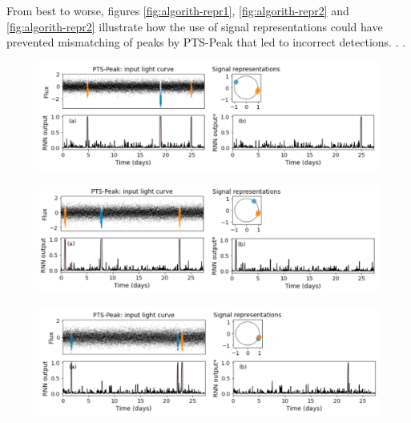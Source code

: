 From best to worse, figures \ref{fig:algorith-repr1}, \ref{fig:algorith-repr2} and \ref{fig:algorith-repr2} illustrate how the use of signal representations could have prevented mismatching of peaks by PTS-Peak that led to incorrect detections. . .

\begin{figure}
    \centering
    \includegraphics[width=0.9\linewidth]{Experiments/Figures/Algorithm/repr1.png}
    \caption{}
    \label{fig:algorithm-repr1}
\end{figure}

\begin{figure}
    \centering
    \includegraphics[width=0.9\linewidth]{Experiments/Figures/Algorithm/repr2.png}
    \caption{}
    \label{fig:algorithm-repr2}
\end{figure}

\begin{figure}
    \centering
    \includegraphics[width=0.9\linewidth]{Experiments/Figures/Algorithm/repr3.png}
    \caption{}
    \label{fig:algorithm-repr3}
\end{figure}
